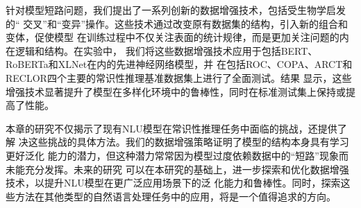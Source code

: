 针对模型短路问题，我们提出了一系列创新的数据增强技术，包括受生物学启发的``
交叉''和``变异''操作。这些技术通过改变原有数据集的结构，引入新的组合和变体，促使模型
在训练过程中不仅关注表面的统计规律，而是更加关注问题的内在逻辑和结构。在实验中，
我们将这些数据增强技术应用于包括BERT、RoBERTa和XLNet在内的先进神经网络模型，并
在包括ROC、COPA、ARCT和RECLOR四个主要的常识性推理基准数据集上进行了全面测试。结果
显示，这些增强技术显著提升了模型在多样化环境中的鲁棒性，同时在标准测试集上保持或提高了性能。

本章的研究不仅揭示了现有NLU模型在常识性推理任务中面临的挑战，还提供了解
决这些挑战的具体方法。我们的数据增强策略证明了模型的结构本身具有学习更好泛化
能力的潜力，但这种潜力常常因为模型过度依赖数据中的``短路''现象而未能充分发挥。未来的研究
可以在本研究的基础上，进一步探索和优化数据增强技术，以提升NLU模型在更广泛应用场景下的泛
化能力和鲁棒性。同时，探索这些方法在其他类型的自然语言处理任务中的应用，将是一个值得追求的方向。

\newpage
\null
\newpage
